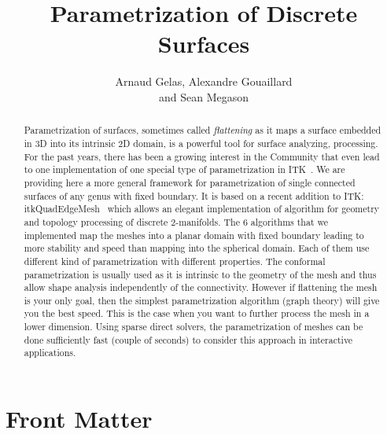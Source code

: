 \documentclass{InsightArticle}
\title{Parametrization of Discrete Surfaces}
\author{Arnaud Gelas, Alexandre Gouaillard\\ and Sean Megason}
\begin{document}
\ifpdf
\else
\fi


\maketitle


\ifhtml
\chapter*{Front Matter\label{front}}
\fi


\begin{abstract}
Parametrization of surfaces, sometimes called \emph{flattening} as it maps a surface embedded in 3D into its intrinsic 2D domain, is a powerful tool for surface analyzing, processing. For the past years, there has been a growing interest in the Community that even lead to one implementation of one special type of parametrization in ITK~\cite{Haker00a,Haker00b,Angenent99,Gao06}. We are providing here a more general framework for parametrization of single connected surfaces of any genus with fixed boundary. It is based on a recent addition to ITK: itkQuadEdgeMesh~\cite{itkQE} which allows an elegant implementation of algorithm for geometry and topology processing of discrete 2-manifolds. The 6 algorithms that we implemented map the meshes into a planar domain with fixed boundary leading to more stability and speed than mapping into the spherical domain. Each of them use different kind of parametrization with different properties. The conformal parametrization is usually used as it is intrinsic to the geometry of the mesh and thus allow shape analysis independently of the connectivity. However if flattening the mesh is your only goal, then the simplest parametrization algorithm (graph theory) will give you the best speed. This is the case when you want to further process the mesh in a lower dimension. Using sparse direct solvers, the parametrization of meshes can be done sufficiently fast (couple of seconds) to consider this approach in interactive applications. 

\noindent
% 
% 
\end{abstract}
\end{document}
